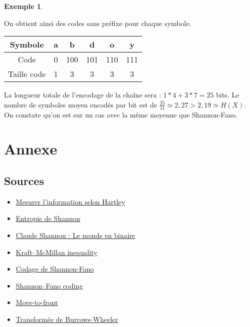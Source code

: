 \documentclass[10pt,a4paper]{article}
\theoremstyle{definition}
\newtheorem{example}{Exemple}
\numberwithin{lemma}{subsection}
\numberwithin{theorem}{subsection}
\numberwithin{definition}{subsection}
\numberwithin{proposition}{subsection}
\numberwithin{corollary}{subsection}
\numberwithin{property}{subsection}
\numberwithin{example}{subsection}
\numberwithin{heuristique}{subsection}
\numberwithin{scenario}{subsection}
\begin{document}
\begin{example}
\begin{itemize}
\begin{center}
\end{center}
\end{itemize}
On obtient ainsi des codes sans préfixe pour chaque symbole.
\par\begin{tabular}{|c|c|c|c|c|c|}
\hline
Symbole & a & b & d & o & y \\
\hline
Code & 0 & 100 & 101 & 110 & 111 \\
\hline
Taille code & 1 & 3 & 3 & 3 & 3 \\
\hline
\end{tabular}
\par La longueur totale de l'encodage de la chaîne sera : $1*4 + 3*7 = 25$ bits. Le nombre de symboles moyen encodés par bit est de $\frac{25}{11} \simeq 2,27 > 2,19 \simeq H(X)$. On constate qu'on est sur un cas avec la même moyenne que Shannon-Fano.
\end{example}

	
	
        
        
   
	
        

\section*{Annexe}
\subsection*{Sources}
\begin{itemize}
\item \href{https://www.sciencepresse.qc.ca/blogue/2014/12/24/mesurer-linformation-selon-hartley}{Mesurer l'information selon Hartley}
\item \href{https://fr.wikipedia.org/wiki/Entropie_de_Shannon}{Entropie de Shannon}
\item \href{https://centenaire-shannon.cnrs.fr/chapter/la-theorie-de-information}{Claude Shannon : Le monde en binaire}
\item \href{https://en.wikipedia.org/wiki/Kraft\%E2\%80\%93McMillan_inequality}{Kraft–McMillan inequality}
\item \href{https://fr.wikipedia.org/wiki/Codage_de_Shannon-Fano}{Codage de Shannon-Fano}
\item \href{https://en.wikipedia.org/wiki/Shannon\%E2\%80\%93Fano_coding}{Shannon–Fano coding}

\item \href{https://fr.wikipedia.org/wiki/Move-to-front}{Move-to-front}
\item \href{https://fr.wikipedia.org/wiki/Transform\%C3\%A9e_de_Burrows-Wheeler}{Transformée de Burrows-Wheeler}
\end{itemize}
\end{document}
